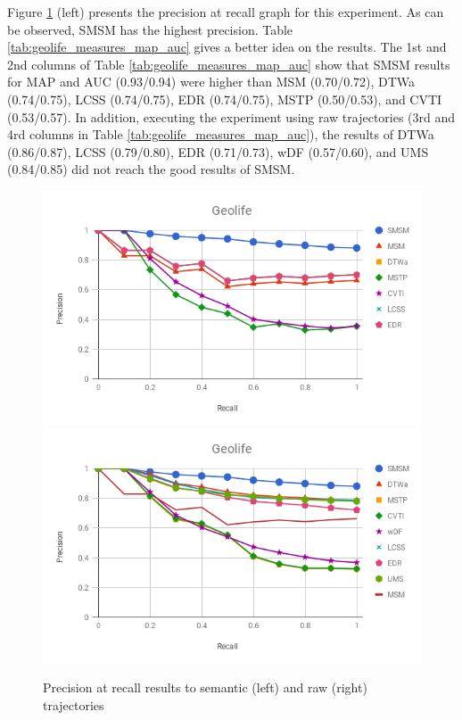 \documentclass[12pt]{article}
\begin{document}
Figure \ref{fig:geolife_precision_recall} (left) presents the precision at recall graph for this experiment. As can be observed, SMSM has the highest precision. Table \ref{tab:geolife_measures_map_auc} gives a better idea on the results. The 1st and 2nd columns of Table \ref{tab:geolife_measures_map_auc} show that SMSM results for MAP and AUC (0.93/0.94) were higher than MSM (0.70/0.72), DTWa (0.74/0.75), LCSS (0.74/0.75), EDR (0.74/0.75), MSTP (0.50/0.53), and CVTI (0.53/0.57). In addition, executing the experiment using raw trajectories (3rd and 4rd columns in Table \ref{tab:geolife_measures_map_auc}), the results of DTWa (0.86/0.87), LCSS (0.79/0.80), EDR (0.71/0.73), wDF (0.57/0.60), and UMS (0.84/0.85) did not reach the good results of SMSM.

\begin{figure}[ht!]
\centerline{
\centering
\includegraphics[width=.55\textwidth]{Images/P_R-chart_Geolife.png}
\includegraphics[width=.55\textwidth]{Images/P_R-chart_Geolife-raw.png}
}
\caption{Precision at recall results to semantic (left) and raw (right) trajectories}
\label{fig:geolife_precision_recall}
\end{figure}
\end{document}
